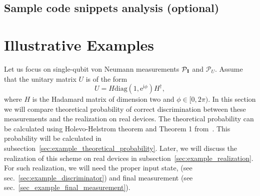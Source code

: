 \documentclass[preprint,12pt, a4paper]{elsarticle}
\newcommand{\1}{{\rm 1\hspace{-0.9mm}l}}
\newcommand{\ee}{\ensuremath{\mathrm{e}}}
\newcommand{\ii}{\ensuremath{\mathrm{i}}}
\newcommand{\PP}{\mathcal{P}}
\newcommand{\diag}{\mathrm{diag}}
\begin{document}
\subsection{Sample code snippets analysis (optional)}
\label{}



\section{Illustrative Examples}

Let us focus on single-qubit von Neumann measurements $\PP_\1$ and $\PP_U$.
Assume that the unitary matrix $U$ is of the form 
\begin{equation}
U = H \diag (1, \ee^{\ii \phi}) H^\dagger,
\end{equation}
where $H$ is the Hadamard matrix of dimension two and $\phi \in [0, 2 \pi)$.
In this section we will compare theoretical probability of correct 
discrimination between these measurements and the realization on real devices.
The theoretical probability can be calculated using Holevo-Helstrom theorem and 
Theorem 1 from~\cite{puchala2018strategies}. 
This probability will be calculated in 
subsection~\ref{sec:example_theoretical_probability}. Later, we will 
discuss the realization of this scheme on real devices in 
subsection~\ref{sec:example_realization}. For such realization, we 
will need the proper input state, (see sec.~\ref{sec:example_discriminator}) 
and final measurement (see sec.~\ref{sec_example_final_measurement}). 
\end{document}
